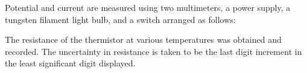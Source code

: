 \begin{paper}
	Potential and current are measured using two multimeters, a power supply, a tungsten filament light bulb, and a switch arranged as follows:
	
	

	The resistance of the thermistor at various temperatures was obtained and recorded. The uncertainty in resistance is taken to be the last digit increment in the least significant digit displayed.
	
\end{paper}
